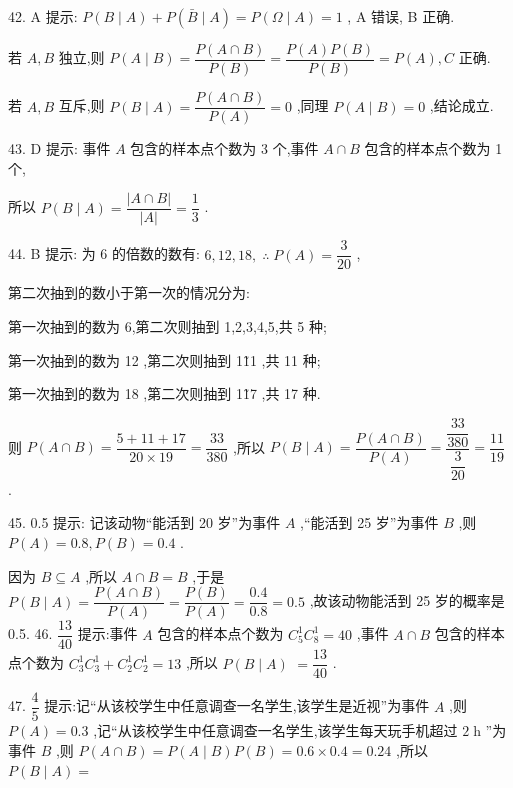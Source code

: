 42. A 提示: $P\left( {B \mid  A}\right)  + P\left( {\bar{B} \mid  A}\right)  = P\left( {\Omega  \mid  A}\right)  = 1$ , A 错误, B 正确.

若 $A,B$ 独立,则 $P\left( {A \mid  B}\right)  = \dfrac{P\left( {A \cap  B}\right) }{P\left( B\right) } = \dfrac{P\left( A\right) P\left( B\right) }{P\left( B\right) } = P\left( A\right) ,C$ 正确.

若 $A,B$ 互斥,则 $P\left( {B \mid  A}\right)  = \dfrac{P\left( {A \cap  B}\right) }{P\left( A\right) } = 0$ ,同理 $P\left( {A \mid  B}\right)  = 0$ ,结论成立.

43. D 提示: 事件 $A$ 包含的样本点个数为 3 个,事件 $A \cap  B$ 包含的样本点个数为 1 个,

所以 $P\left( {B \mid  A}\right)  = \dfrac{\left| A \cap  B\right| }{\left| A\right| } = \dfrac{1}{3}$ .

44. B 提示: 为 6 的倍数的数有: $6,{12},{18},\;\therefore \;P\left( A\right)  = \dfrac{3}{20}$ ,

第二次抽到的数小于第一次的情况分为:

第一次抽到的数为 6,第二次则抽到 1,2,3,4,5,共 5 种;

第一次抽到的数为 12 ,第二次则抽到 1\~11 ,共 11 种;

第一次抽到的数为 18 ,第二次则抽到 1\~17 ,共 17 种.

则 $P\left( {A \cap  B}\right)  = \dfrac{5 + {11} + {17}}{{20} \times  {19}} = \dfrac{33}{380}$ ,所以 $P\left( {B \mid  A}\right)  = \dfrac{P\left( {A \cap  B}\right) }{P\left( A\right) } = \dfrac{\dfrac{33}{380}}{\dfrac{3}{20}} = \dfrac{11}{19}$ .

45. 0.5 提示: 记该动物“能活到 20 岁”为事件 $A$ ,“能活到 25 岁”为事件 $B$ ,则 $P\left( A\right)  = {0.8},P\left( B\right)  = {0.4}$ .

因为 $B \subseteq  A$ ,所以 $A \cap  B = B$ ,于是 $P\left( {B \mid  A}\right)  = \dfrac{P\left( {A \cap  B}\right) }{P\left( A\right) } = \dfrac{P\left( B\right) }{P\left( A\right) } = \dfrac{0.4}{0.8} = {0.5}$ ,故该动物能活到 25 岁的概率是 0.5. 46. $\dfrac{13}{40}$ 提示:事件 $A$ 包含的样本点个数为 ${C}_{5}^{1}{C}_{8}^{1} = {40}$ ,事件 $A \cap  B$ 包含的样本点个数为 ${C}_{3}^{1}{C}_{3}^{1} + {C}_{2}^{1}{C}_{2}^{1} = {13}$ ,所以 $P\left( {B \mid  A}\right)$  $= \dfrac{13}{40}$ .

47. $\dfrac{4}{5}$ 提示:记“从该校学生中任意调查一名学生,该学生是近视”为事件 $A$ ,则 $P\left( A\right)  = {0.3}$ ,记“从该校学生中任意调查一名学生,该学生每天玩手机超过 $2\mathrm{\;h}$ ”为事件 $B$ ,则 $P\left( {A \cap  B}\right)  = P\left( {A \mid  B}\right) P\left( B\right)  = {0.6} \times  {0.4} = {0.24}$ ,所以 $P\left( {B \mid  A}\right)  =$

